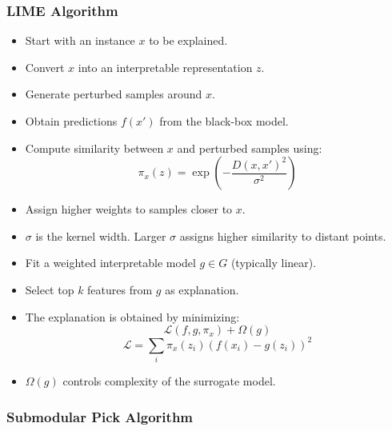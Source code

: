 \documentclass[10pt,a4paper]{article}
\begin{document}
		\subsubsection{LIME Algorithm}
		
		\begin{itemize}
		    \item Start with an instance $x$ to be explained.
		    \item Convert $x$ into an interpretable representation $z$.
		    \item Generate perturbed samples around $x$.
		    \item Obtain predictions $f(x')$ from the black-box model.
		    \item Compute similarity between $x$ and perturbed samples using:
		    \[
		    \pi_x(z) = \exp\left(-\frac{D(x, x')^2}{\sigma^2}\right)
		    \]
		    \item Assign higher weights to samples closer to $x$.
		    \item $\sigma$ is the kernel width. Larger $\sigma$ assigns higher similarity to distant points.
		    \item Fit a weighted interpretable model $g \in G$ (typically linear).
		    \item Select top $k$ features from $g$ as explanation.
			\item The explanation is obtained by minimizing:
			\[
			\mathcal{L}(f, g, \pi_x) + \Omega(g)
			\]
			\[
			\mathcal{L} = \sum_{i} \pi_x(z_i)\left(f(x_i) - g(z_i)\right)^2
			\]
			\item $\Omega(g)$ controls complexity of the surrogate model.
		\end{itemize}
		
		
		\subsubsection{Submodular Pick Algorithm}
		
\end{document}
